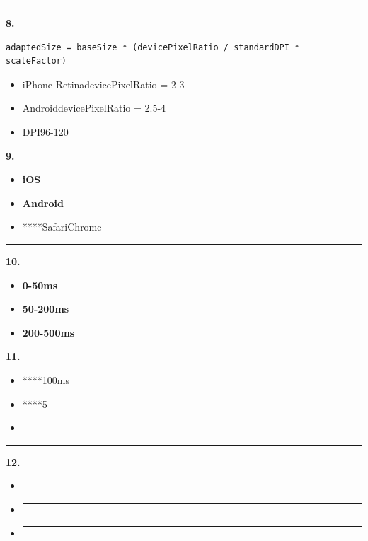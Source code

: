 \begin{center}\rule{0.5\linewidth}{0.5pt}\end{center}

\textbf{8. }

\begin{verbatim}
adaptedSize = baseSize * (devicePixelRatio / standardDPI * scaleFactor)
\end{verbatim}

\begin{itemize}
\tightlist
\item
  iPhone RetinadevicePixelRatio = 2-3
\item
  AndroiddevicePixelRatio = 2.5-4
\item
  DPI96-120
\end{itemize}

\textbf{9. }

\begin{itemize}
\tightlist
\item
  \textbf{iOS}
\item
  \textbf{Android}
\item
  ****SafariChrome
\end{itemize}

\begin{center}\rule{0.5\linewidth}{0.5pt}\end{center}

\textbf{10. }

\begin{itemize}
\tightlist
\item
  \textbf{0-50ms}
\item
  \textbf{50-200ms}
\item
  \textbf{200-500ms}
\end{itemize}

\textbf{11. }

\begin{itemize}
\item
  ****100ms
\item
  ****5
\item
  \begin{center}\rule{0.5\linewidth}{0.5pt}\end{center}
\end{itemize}

\begin{center}\rule{0.5\linewidth}{0.5pt}\end{center}

\textbf{12. }

\begin{itemize}
\item
  \begin{center}\rule{0.5\linewidth}{0.5pt}\end{center}
\item
  \begin{center}\rule{0.5\linewidth}{0.5pt}\end{center}
\item
  \begin{center}\rule{0.5\linewidth}{0.5pt}\end{center}
\end{itemize}

